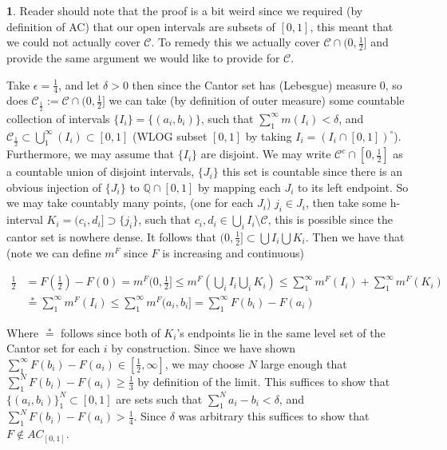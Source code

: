 \documentclass[10.5pt]{article}
\theoremstyle{definition}
\newtheorem{pb}{}
\newcommand{\set}[1]{\{#1\}}
\begin{document}
    \begin{pb}
        Reader should note that the proof is a bit weird since we required (by definition of AC) that our open intervals are subsets of \([0,1]\), this meant that we could not actually cover \(\mathcal{C}\). To remedy this we actually cover \(\mathcal{C}\cap (0,\frac12]\) and provide the same argument we would like to provide for \(\mathcal{C}\).

        Take \(\epsilon = \frac14\), and let \(\delta>0\) then since the Cantor set has (Lebesgue) measure \(0\), so does \(\mathcal{C}_{\frac12} := \mathcal{C}\cap (0,\frac12]\) we can take (by definition of outer measure) some countable collection of intervals \(\set{I_i} = \set{(a_i,b_i)}\), such that \(\sum_1^\infty m(I_i) < \delta\), and \(\mathcal{C}_{\frac12} \subset \bigcup_1^\infty (I_i) \subset [0,1]\) (WLOG subset \([0,1]\) by taking \(I_i = (I_i \cap [0,1])^\circ\)). Furthermore, we may assume that \(\set{I_i}\) are disjoint. We may write \(\mathcal{C}^c \cap [0,\frac12]\) as a countable union of disjoint intervals, \(\set{J_i}\) this set is countable since there is an obvious injection of \(\set{J_i}\) to \(\mathbb{Q}\cap[0,1]\) by mapping each \(J_i\) to its left endpoint. So we may take countably many points, (one for each \(J_i\)) \(j_i \in J_i\), then take some h-interval \(K_i = (c_i,d_i]\supset \set{j_i}\), such that \(c_i,d_i \in \bigcup_i I_i \setminus \mathcal{C}\), this is possible since the cantor set is nowhere dense. It follows that \((0,\frac12] \subset \bigcup I_i \bigcup K_i\). Then we have that (note we can define \(m^F\) since \(F\) is increasing and continuous)

        \begin{align*}
            \frac12 &= F(\frac12) - F(0) = m^F(0,\frac12] \leq m^F\left(\bigcup_i I_i \bigcup_i K_i\right)
            \leq \sum_1^\infty m^F(I_i) + \sum_1^\infty m^F(K_i) \\
            &\overset{*}{=} \sum_1^\infty m^F(I_i) \leq \sum_1^\infty m^F(a_i,b_i] = \sum_1^\infty F(b_i) - F(a_i)
        \end{align*}

        Where \(\overset{*}{=}\) follows since both of \(K_i\)'s endpoints lie in the same level set of the Cantor set for each \(i\) by construction. Since we have shown  \(\sum_1^\infty F(b_i) - F(a_i) \in [\frac12,\infty]\), we may choose \(N\) large enough that \(\sum_1^N F(b_i)-F(a_i) \geq \frac{1}{3}\) by definition of the limit. This suffices to show that \(\set{(a_i,b_i)}_1^N \subset [0,1]\) are sets such that \(\sum_1^N a_i - b_i < \delta\), and \(\sum_1^N F(b_i) - F(a_i) > \frac{1}{4}\). Since \(\delta\) was arbitrary this suffices to show that \(F \not \in AC_{[0,1]}\).
        
        
    \end{pb}
\end{document}
